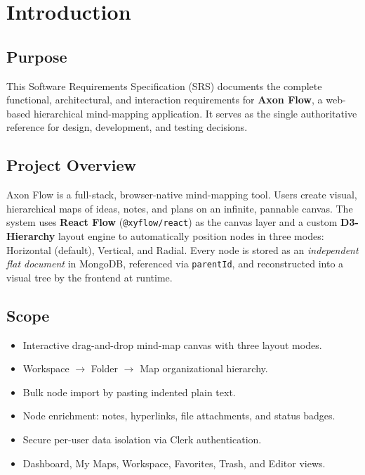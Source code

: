 \documentclass[12pt, a4paper]{article}
\begin{document}
\section{Introduction}

\subsection{Purpose}
This Software Requirements Specification (SRS) documents the complete functional, architectural, and interaction requirements for \textbf{Axon Flow}, a web-based hierarchical mind-mapping application. It serves as the single authoritative reference for design, development, and testing decisions.

\subsection{Project Overview}
Axon Flow is a full-stack, browser-native mind-mapping tool. Users create visual, hierarchical maps of ideas, notes, and plans on an infinite, pannable canvas. The system uses \textbf{React Flow} (\texttt{@xyflow/react}) as the canvas layer and a custom \textbf{D3-Hierarchy} layout engine to automatically position nodes in three modes: Horizontal (default), Vertical, and Radial. Every node is stored as an \textit{independent flat document} in MongoDB, referenced via \texttt{parentId}, and reconstructed into a visual tree by the frontend at runtime.

\subsection{Scope}
\begin{itemize}[noitemsep]
  \item Interactive drag-and-drop mind-map canvas with three layout modes.
  \item Workspace $\rightarrow$ Folder $\rightarrow$ Map organizational hierarchy.
  \item Bulk node import by pasting indented plain text.
  \item Node enrichment: notes, hyperlinks, file attachments, and status badges.
  \item Secure per-user data isolation via Clerk authentication.
  \item Dashboard, My Maps, Workspace, Favorites, Trash, and Editor views.
\end{itemize}
\end{document}
